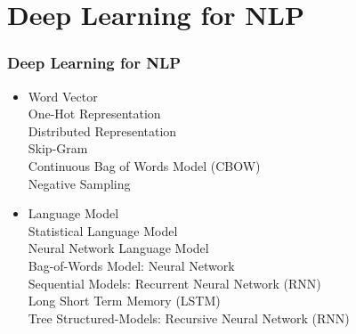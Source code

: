 
\ifx\allfiles\undefined

\fi
\section{Deep Learning for NLP}
\begin{frame}
\frametitle{Deep Learning for NLP}
	\small
	\begin{itemize}
		\item Word Vector
			\\\hspace{1cm} One-Hot Representation
			\\\hspace{1cm} Distributed Representation
				\\\hspace{2cm} Skip-Gram
				\\\hspace{2cm} Continuous Bag of Words Model (CBOW)
				\\\hspace{2cm} Negative Sampling
		\item Language Model
			\\\hspace{1cm}  Statistical Language Model
			\\\hspace{1cm} Neural Network Language Model
				\\\hspace{2cm} Bag-of-Words Model: Neural Network
				\\\hspace{2cm} Sequential Models: Recurrent Neural Network (RNN) 
				\\\hspace{2cm} Long Short Term Memory (LSTM)
				\\\hspace{2cm} Tree Structured-Models: Recursive Neural Network (RNN)
	\end{itemize}
\end{frame}
